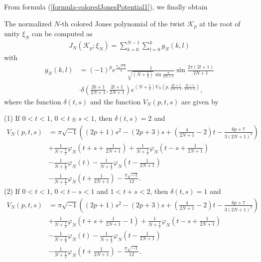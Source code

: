 \documentclass[12pt]{amsart}
\begin{document}
From formula (\ref{formula-coloredJonesPotential1}),  we finally obtain
\begin{proposition}   \label{prop-coloredJonespotential}
The normalized $N$-th colored Jones polynomial of the twist $\mathcal{K}_p$ at the root of unity $\xi_N$ can be computed as
\begin{align} \label{formula-coloredJonespotential2}
     J_N(\mathcal{K}_{p};\xi_N)=\sum_{k=0}^{N-1}\sum_{l=0}^k g_N(k,l)
\end{align}
with
\begin{align}
    g_N(k,l)&=(-1)^pe^{\frac{\pi\sqrt{-1}}{4}}\frac{1}{\sqrt{(N+\frac{1}{2})}\sin\frac{\pi}{2N+1}}\sin \frac{2\pi (2l+1)}{2N+1}\\\nonumber
    &\cdot \delta\left(\frac{2k+1}{2N+1},\frac{2l+1}{2N+1}\right)e^{(N+\frac{1}{2})V_N\left(p,\frac{2k+1}{2N+1},\frac{2l+1}{2N+1}\right)},
\end{align}
where the function $\delta(t,s)$ and the function $V_N(p,t,s)$ are  given by  

(1) If $0<t<1$, $0<t\pm s<1$, then $\delta(t,s)=2$ and
\begin{align}
    V_N(p,t,s)&=\pi \sqrt{-1}\left((2p+1)s^2-(2p+3)s+\left(\frac{4}{2N+1}-2\right)t-\frac{6p+7}{3(2N+1)^2}\right)\\\nonumber
    &+\frac{1}{N+\frac{1}{2}}\varphi_N\left(t+s+\frac{1}{2N+1}\right)+\frac{1}{N+\frac{1}{2}}\varphi_N\left(t-s+\frac{1}{2N+1}\right)\\\nonumber
    &-\frac{1}{N+\frac{1}{2}}\varphi_N\left(t\right)-\frac{1}{N+\frac{1}{2}}\varphi_N\left(t-\frac{1}{2N+1}\right)\\\nonumber
    &-\frac{1}{N+\frac{1}{2}}\varphi_N\left(t+\frac{1}{2N+1}\right)-\frac{\pi\sqrt{-1}}{12 }.
\end{align}
(2)  If $0<t<1$, $0<t-s<1$ and $1<t+s<2$, then $\delta(t,s)=1$ and 
\begin{align}
    V_N(p,t,s)&=\pi \sqrt{-1}\left((2p+1)s^2-(2p+3)s+\left(\frac{4}{2N+1}-2\right)t-\frac{6p+7}{3(2N+1)^2}\right)\\\nonumber
    &+\frac{1}{N+\frac{1}{2}}\varphi_N\left(t+s+\frac{1}{2N+1}-1\right)+\frac{1}{N+\frac{1}{2}}\varphi_N\left(t-s+\frac{1}{2N+1}\right)\\\nonumber
    &-\frac{1}{N+\frac{1}{2}}\varphi_N\left(t\right)-\frac{1}{N+\frac{1}{2}}\varphi_N\left(t-\frac{1}{2N+1}\right)\\\nonumber
    &-\frac{1}{N+\frac{1}{2}}\varphi_N\left(t+\frac{1}{2N+1}\right)-\frac{\pi\sqrt{-1}}{12 }.
\end{align}
\end{proposition}
\end{document}
